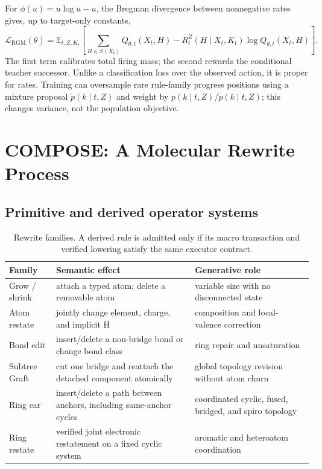 \documentclass{article}
\newcommand{\Sset}{\mathcal{S}}
\newcommand{\E}{\mathbb{E}}
\theoremstyle{definition}
\theoremstyle{remark}
\begin{document}
For $\phi(u)=u\log u-u$, the Bregman divergence between nonnegative rates gives, up to target-only constants,
\begin{equation}
\mathcal L_{\mathrm{RGM}}(\theta)=
\E_{t,Z,K_t}\left[
\sum_{H\in\Sset(X_t)}
Q_{\theta,t}(X_t,H)-
R_t^Z(H\mid X_t,K_t)\log Q_{\theta,t}(X_t,H)
\right].
\label{eq:gm-objective}
\end{equation}
The first term calibrates total firing mass; the second rewards the conditional teacher successor. Unlike a classification loss over the observed action, it is proper for rates. Training can oversample rare rule-family progress positions using a mixture proposal $\widetilde p(k\mid t,Z)$ and weight by $p(k\mid t,Z)/\widetilde p(k\mid t,Z)$; this changes variance, not the population objective.

\section{COMPOSE: A Molecular Rewrite Process}

\subsection{Primitive and derived operator systems}

\begin{table}[t]
\centering
\caption{Rewrite families. A derived rule is admitted only if its macro transaction and verified lowering satisfy the same executor contract.}
\label{tab:operators}
\small
\begin{tabularx}{\textwidth}{lXX}
\toprule
Family & Semantic effect & Generative role\\
\midrule
Grow / shrink & attach a typed atom; delete a removable atom & variable size with no disconnected state\\
Atom restate & jointly change element, charge, and implicit H & composition and local-valence correction\\
Bond edit & insert/delete a non-bridge bond or change bond class & ring repair and unsaturation\\
Subtree Graft & cut one bridge and reattach the detached component atomically & global topology revision without atom churn\\
Ring ear & insert/delete a path between anchors, including same-anchor cycles & coordinated cyclic, fused, bridged, and spiro topology\\
Ring restate & verified joint electronic restatement on a fixed cyclic system & aromatic and heteroatom coordination\\
\bottomrule
\end{tabularx}
\end{table}
\end{document}
